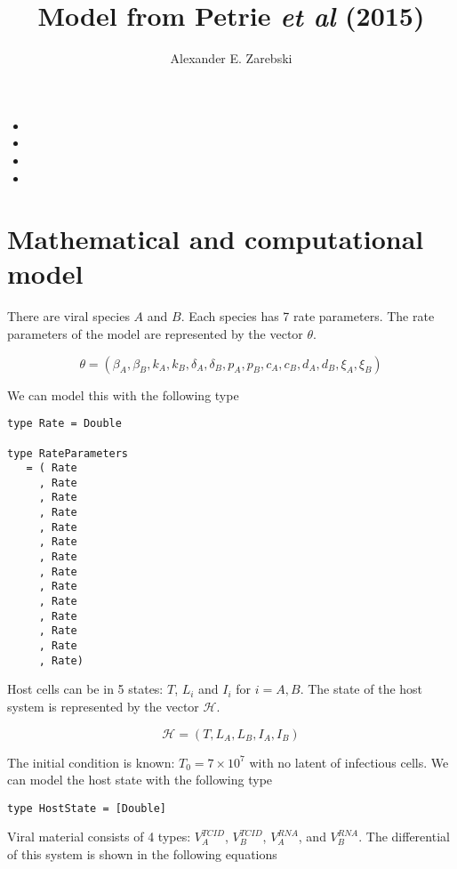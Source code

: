 \documentclass{article}
\title{Model from Petrie \emph{et al} (2015)}
\date{}
\author{Alexander E. Zarebski}
\begin{document}
\maketitle

\begin{itemize}
\item 
\item 
\item 
\item 
\end{itemize}

\section{Mathematical and computational model}
There are viral species \(A\) and \(B\). Each species has 7 rate parameters. The
rate parameters of the model are represented by the vector \(\theta\).

\begin{equation}
  \theta = (\beta_A,\beta_B,k_A,k_B,\delta_A,\delta_B,p_A,p_B,c_A,c_B,d_A,d_B,\xi_A,\xi_B)
\end{equation}

We can model this with the following type

\begin{lstlisting}[caption={Give me a real caption}, label=parameterTypeDefn]
type Rate = Double

type RateParameters
   = ( Rate
     , Rate
     , Rate
     , Rate
     , Rate
     , Rate
     , Rate
     , Rate
     , Rate
     , Rate
     , Rate
     , Rate
     , Rate
     , Rate)
\end{lstlisting}

Host cells can be in 5 states: \(T\), \(L_i\) and \(I_i\) for \(i=A,B\). The
state of the host system is represented by the vector \(\mathcal{H}\).

\begin{equation}
  \mathcal{H} = (T,L_A,L_B,I_A,I_B)
\end{equation}

The initial condition is known: \(T_0 = 7\times 10^7\) with no latent of
infectious cells. We can model the host state with the following type

\begin{lstlisting}[caption={Give me a real caption}, label=parameterHostDefn]
type HostState = [Double]
\end{lstlisting}

Viral material consists of 4 types: \(V^{TCID}_A\), \(V^{TCID}_B\),
\(V^{RNA}_A\), and \(V^{RNA}_B\). The differential of this system is shown in
the following equations
\end{document}
